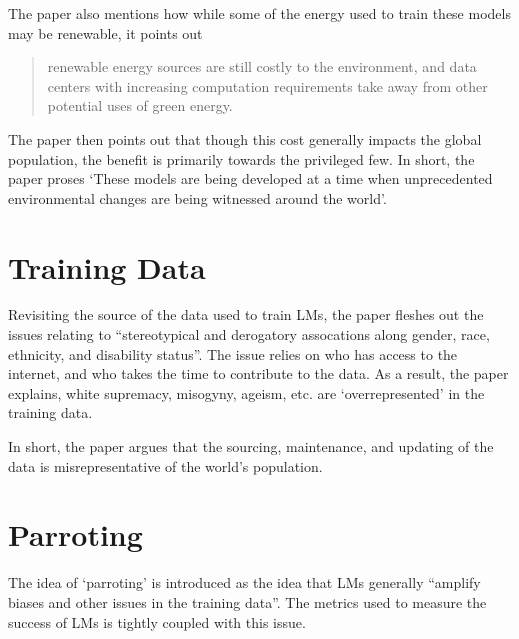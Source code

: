 \documentclass[12pt]{article}
\begin{document}
The paper also mentions how while some of the energy used to train these models
may be renewable, it points out

\begin{quote}
    renewable energy sources are still costly to the environment, and data
    centers with increasing computation requirements take away from other
    potential uses of green energy.
\end{quote}

The paper then points out that though this cost generally impacts the global
population, the benefit is primarily towards the privileged few. In short, the
paper proses `These models are being developed at a time when unprecedented
environmental changes are being witnessed around the world'.

\section*{Training Data}
Revisiting the source of the data used to train LMs, the paper fleshes out the
issues relating to ``stereotypical and derogatory assocations along gender,
race, ethnicity, and disability status''. The issue relies on who has access
to the internet, and who takes the time to contribute to the data. As a result,
the paper explains, white supremacy, misogyny, ageism, etc. are `overrepresented'
in the training data. 

In short, the paper argues that the sourcing, maintenance, and updating of the data
is misrepresentative of the world's population.

\section*{Parroting}
The idea of `parroting' is introduced as the idea that LMs generally ``amplify
biases and other issues in the training data''. The metrics used to measure
the success of LMs is tightly coupled with this issue.
\end{document}
